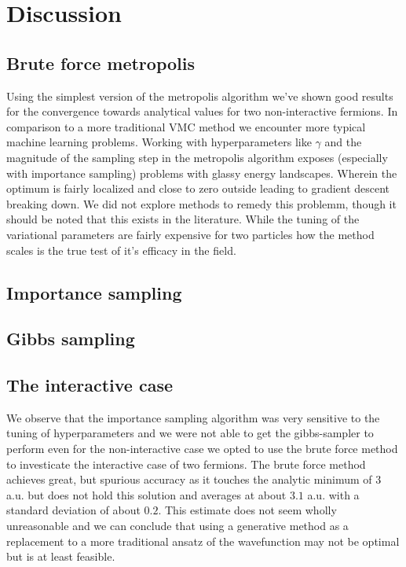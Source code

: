 \section{Discussion}
\subsection{Brute force metropolis}

Using the simplest version of the metropolis algorithm we've shown good results for the convergence towards analytical values for two non-interactive fermions. In comparison to a more traditional VMC method we encounter more typical machine learning problems. Working with hyperparameters like $\gamma$ and the magnitude of the sampling step in the metropolis algorithm exposes (especially with importance sampling) problems with glassy energy landscapes. Wherein the optimum is fairly localized and close to zero outside leading to gradient descent breaking down. We did not explore methods to remedy this problemm, though it should be noted  that this exists in the literature.  While the tuning of the variational parameters are fairly expensive for two particles how the method scales is the  true test of it's efficacy in the field. 

\subsection{Importance sampling}


\subsection{Gibbs sampling}

\subsection{The interactive case}

We observe that the importance sampling algorithm was very sensitive to the tuning of hyperparameters and we were not able to get the gibbs-sampler to perform even for the non-interactive case we opted to use the brute force method to investicate the interactive case of two fermions. The brute force method achieves great, but spurious accuracy as it touches the analytic minimum of 3 a.u. but does not hold this solution and averages at about $3.1$ a.u. with a standard deviation of about $0.2$. This estimate does not seem wholly unreasonable  and we can conclude that using a generative method as a replacement to a more traditional ansatz of the wavefunction may not be optimal but is at least feasible. 